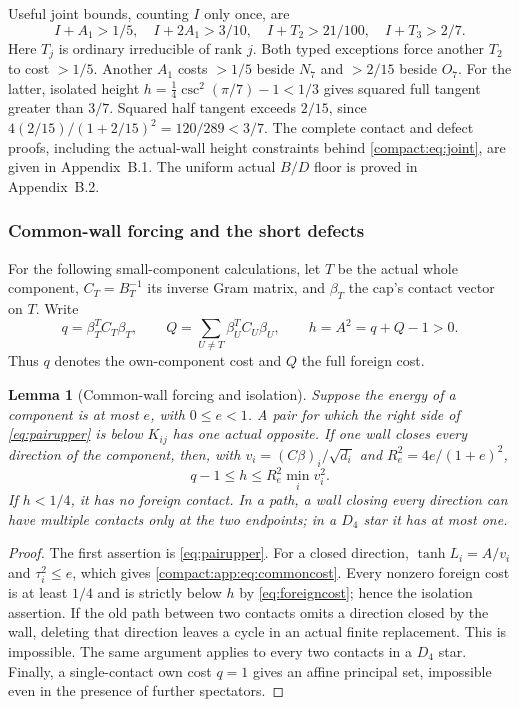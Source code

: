 \documentclass[11pt]{article}
\newtheorem{lemma}[theorem]{Lemma}
\theoremstyle{remark}\newtheorem{remark}[theorem]{Remark}
\numberwithin{equation}{section}
\begin{document}
Useful joint bounds, counting \(I\) only once, are
 \begin{equation}
\label{compact:eq:joint}
 I+A_1>1/5,\quad I+2A_1>3/10,\quad
 I+T_2>21/100,\quad I+T_3>2/7.
\end{equation}
Here \(T_j\) is ordinary irreducible of rank \(j\).
Both typed exceptions force another \(T_2\) to cost \(>1/5\).
Another \(A_1\) costs \(>1/5\) beside \(N_7\) and \(>2/15\)
beside \(O_7\). For the latter, isolated height
 \(h=\tfrac14\csc^2(\pi/7)-1<1/3\) gives squared full tangent
greater than \(3/7\). Squared half tangent exceeds \(2/15\),
since \(4(2/15)/(1+2/15)^2=120/289<3/7\).
The complete contact and defect proofs, including the actual-wall
height constraints behind \eqref{compact:eq:joint}, are given in
Appendix~B.1. The uniform actual \(B/D\) floor
is proved in Appendix~B.2.

\subsubsection{Common-wall forcing and the short defects}
For the following small-component calculations, let $T$ be the actual
whole component, $C_T=B_T^{-1}$ its inverse Gram matrix, and $\beta_T$
the cap's contact vector on $T$. Write
\[
 q=\beta_T^TC_T\beta_T,\qquad Q=\sum_{U\ne T}\beta_U^TC_U\beta_U,
 \qquad h=A^2=q+Q-1>0.
\]
Thus $q$ denotes the own-component cost and $Q$ the full foreign cost.

\begin{lemma}[Common-wall forcing and isolation]\label{compact:app:lem:ordinaryforcing}
Suppose the energy of a component is at most $e$, with $0\le e<1$. A pair for which
the right side of \eqref{eq:pairupper} is below $K_{ij}$ has one
actual opposite. If one wall closes every direction of the component,
then, with $v_i=(C\beta)_i/\sqrt{d_i}$ and
 $R_e^2=4e/(1+e)^2$,
\begin{equation}\label{compact:app:eq:commoncost}
 q-1\le h\le R_e^2\min_i v_i^2.
\end{equation}
If $h<1/4$, it has no foreign contact. In a path, a wall closing
every direction can have multiple contacts only at the two endpoints;
in a $D_4$ star it has at most one.
\end{lemma}
\begin{proof}
The first assertion is \eqref{eq:pairupper}. For a closed direction,
$\tanh L_i=A/v_i$ and $\tau_i^2\le e$, which gives
\eqref{compact:app:eq:commoncost}. Every nonzero foreign cost is at least $1/4$
and is strictly below $h$ by \eqref{eq:foreigncost}; hence the isolation
assertion. If the old path between two contacts omits a direction
closed by the wall, deleting that direction leaves a cycle in an
actual finite replacement. This is impossible. The same argument
applies to every two contacts in a $D_4$ star. Finally, a single-contact
own cost $q=1$ gives an affine principal set, impossible even in the
presence of further spectators.
\end{proof}
\end{document}
